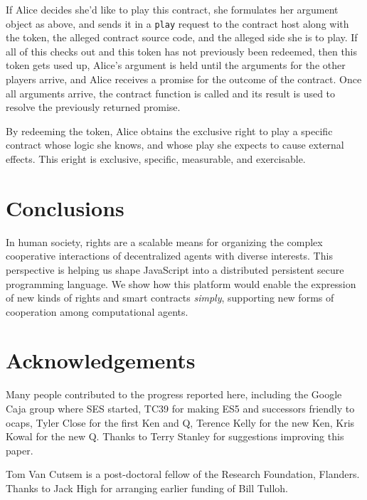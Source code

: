 \documentclass{llncs}
\begin{document}
If Alice decides she'd like to play this contract, she formulates her argument object as above, and sends it in a {\tt play} request to the contract host along with the token, the alleged contract source code, and the alleged side she is to play. If all of this checks out and this token has not previously been redeemed, then this token gets used up, Alice's argument is held until the arguments for the other players arrive, and Alice receives a promise for the outcome of the contract. Once all arguments arrive, the contract function is called and its result is used to resolve the previously returned promise.

By redeeming the token, Alice obtains the exclusive right to play a specific contract whose logic she knows, and whose play she expects to cause external effects. This eright is exclusive, specific, measurable, and exercisable. 

\section*{Conclusions}
\label{conclusions}

In human society, rights are a scalable means for organizing the complex cooperative interactions of  decentralized agents with diverse interests. This perspective is helping us shape JavaScript into a distributed persistent secure programming language. We show how this platform would enable the expression of new kinds of rights and smart contracts \emph{simply}, supporting new forms of cooperation among computational agents.



\section*{Acknowledgements}

Many people contributed to the progress reported here, including the Google Caja group where SES started, TC39 for making ES5 and successors friendly to ocaps, Tyler Close for the first Ken and Q, Terence Kelly for the new Ken, Kris Kowal for the new Q. Thanks to Terry Stanley for suggestions improving this paper.

Tom Van Cutsem is a post-doctoral fellow of the Research Foundation, Flanders. Thanks to Jack High for arranging earlier funding of Bill Tulloh. 



% 

\end{document}
